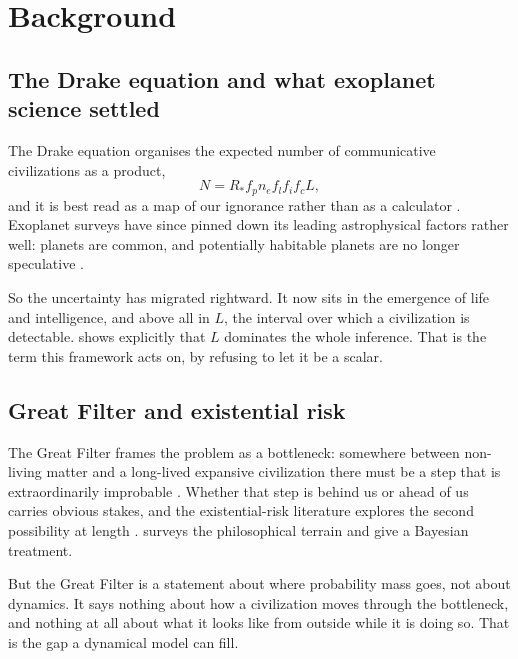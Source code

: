 \section{Background}
\label{sec:background}

\subsection{The Drake equation and what exoplanet science settled}

The Drake equation organises the expected number of communicative civilizations
as a product,
\begin{equation}
  N = R_* f_p n_e f_l f_i f_c L ,
  \label{eq:drake}
\end{equation}
and it is best read as a map of our ignorance rather than as a calculator
\citep{drake1992}. Exoplanet surveys have since pinned down its leading
astrophysical factors rather well: planets are common, and potentially habitable
planets are no longer speculative
\citep{borucki2016,batalha2014,dressing2015,kopparapu2013,seager2013}.
\Established

So the uncertainty has migrated rightward. It now sits in the emergence of life
and intelligence, and above all in $L$, the interval over which a civilization is
detectable. \citet{prantzos2020} shows explicitly that $L$ dominates the whole
inference. That is the term this framework acts on, by refusing to let it be a
scalar.

\subsection{Great Filter and existential risk}

The Great Filter frames the problem as a bottleneck: somewhere between
non-living matter and a long-lived expansive civilization there must be a step
that is extraordinarily improbable \citep{hanson1998filter}. Whether that step is
behind us or ahead of us carries obvious stakes, and the existential-risk
literature explores the second possibility at length
\citep{bostrom2002,bostrom2013,ord2020,haggstrom2016}. \citet{cirkovic2018}
surveys the philosophical terrain and \citet{verendel2017} give a Bayesian
treatment.

But the Great Filter is a statement about where probability mass goes, not about
dynamics. It says nothing about how a civilization moves through the bottleneck,
and nothing at all about what it looks like from outside while it is doing so.
That is the gap a dynamical model can fill.

